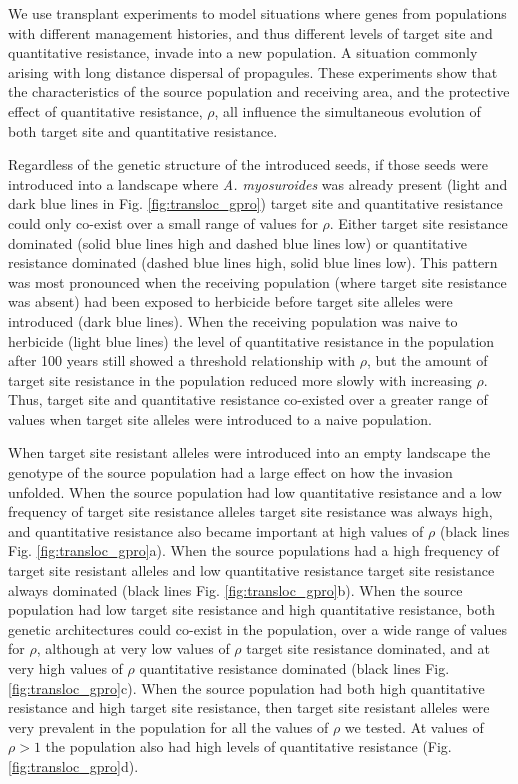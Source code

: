 \documentclass[10pt,letterpaper]{article}
\begin{document}
We use transplant experiments to model situations where genes from populations with different management histories, and thus different levels of target site and quantitative resistance, invade into a new population. A situation commonly arising with long distance dispersal of propagules. These experiments show that the characteristics of the source population and receiving area, and the protective effect of quantitative resistance, $\rho$, all influence the simultaneous evolution of both target site and quantitative resistance. 

Regardless of the genetic structure of the introduced seeds, if those seeds were introduced into a landscape where \textit{A. myosuroides} was already present (light and dark blue lines in Fig. \ref{fig:transloc_gpro}) target site and quantitative resistance could only co-exist over a small range of values for $\rho$. Either target site resistance dominated (solid blue lines high and dashed blue lines low) or quantitative resistance dominated (dashed blue lines high, solid blue lines low). This pattern was most pronounced when the receiving population (where target site resistance was absent) had been exposed to herbicide before target site alleles were introduced (dark blue lines). When the receiving population was naive to herbicide (light blue lines) the level of quantitative resistance in the population after 100 years still showed a threshold relationship with $\rho$, but the amount of target site resistance in the population reduced more slowly with increasing $\rho$. Thus, target site and quantitative resistance co-existed over a greater range of values when target site alleles were introduced to a naive population.

When target site resistant alleles were introduced into an empty landscape the genotype of the source population had a large effect on how the invasion unfolded. When the source population had low quantitative resistance and a low frequency of target site resistance alleles target site resistance was always high, and quantitative resistance also became important at high values of $\rho$ (black lines Fig. \ref{fig:transloc_gpro}a). When the source populations had a high frequency of target site resistant alleles and low quantitative resistance target site resistance always dominated (black lines Fig. \ref{fig:transloc_gpro}b). When the source population had low target site resistance and high quantitative resistance, both genetic architectures could co-exist in the population, over a wide range of values for $\rho$, although at very low values of $\rho$ target site resistance dominated, and at very high values of $\rho$ quantitative resistance dominated (black lines Fig. \ref{fig:transloc_gpro}c). When the source population had both high quantitative resistance and high target site resistance, then target site resistant alleles were very prevalent in the population for all the values of $\rho$ we tested. At values of $\rho > 1$ the population also had high levels of quantitative resistance (Fig. \ref{fig:transloc_gpro}d).                      
\end{document}
